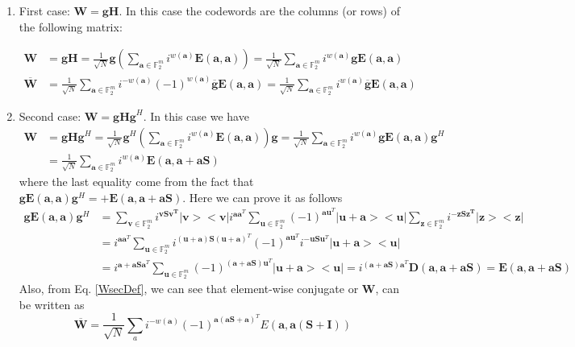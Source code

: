 \documentclass{article}
\begin{document}
	\begin{enumerate}
		\item First case:
		$\mathbf{W=gH}$. In this case the codewords are the columns (or rows) of the following matrix:
		
		\begin{align}
			\mathbf{W} &= \mathbf{g}\mathbf{H} = \frac{1}{\sqrt{N}}\mathbf{g}\left(\sum_{\mathbf{a} \in \mathbb{F}^m_2} i^{w(\mathbf{a})}\mathbf{E}(\mathbf{a},\mathbf{a})\right) = \frac{1}{\sqrt{N}}\sum_{\mathbf{a} \in \mathbb{F}^m_2} i^{w(\mathbf{a})}\mathbf{g}\mathbf{E}(\mathbf{a},\mathbf{a}) \label{WfirstDef} \\
			\overline{\mathbf{W}} &= \frac{1}{\sqrt{N}}\sum_{\mathbf{a} \in \mathbb{F}^m_2} i^{-w(\mathbf{a})}(-1)^{w(\mathbf{a})}\overline{\mathbf{g}}\mathbf{E}(\mathbf{a},\mathbf{a}) = \frac{1}{\sqrt{N}}\sum_{\mathbf{a} \in \mathbb{F}^m_2} i^{w(\mathbf{a})}\overline{\mathbf{g}}\mathbf{E}(\mathbf{a},\mathbf{a}) \label{WbarFirstDef}
		\end{align}
	\item Second case: $\mathbf{W=gHg}^H$. In this case we have
	\begin{align}
		\mathbf{W} &= \mathbf{g}\mathbf{H}\mathbf{g}^H = \frac{1}{\sqrt{N}}\mathbf{g}^H\left(\sum_{\mathbf{a} \in \mathbb{F}^m_2} i^{w(\mathbf{a})}\mathbf{E}(\mathbf{a},\mathbf{a})\right)\mathbf{g} = \frac{1}{\sqrt{N}}\sum_{\mathbf{a} \in \mathbb{F}^m_2} i^{w(\mathbf{a})}\mathbf{g}\mathbf{E}(\mathbf{a},\mathbf{a})\mathbf{g}^H\nonumber  \\ 
		&=\frac{1}{\sqrt{N}}\sum_{\mathbf{a} \in \mathbb{F}^m_2} i^{w(\mathbf{a})}\mathbf{E}(\mathbf{a, a+aS}) \label{WsecDef}
	\end{align}
where the last equality come from the fact that $\mathbf{g}\mathbf{E}(\mathbf{a},\mathbf{a}) \mathbf{g}^H = +\mathbf{E}(\mathbf{a,a+a S})$. Here we can prove it as follows
	\begin{align*}
		\mathbf{g} \mathbf{E}(\mathbf{a,a}) \mathbf{g}^H &=\sum_{\mathbf{v} \in \mathbb{F}^m_2}{i^{\mathbf{v S v^T}} |\mathbf{v}><\mathbf{v}|} i^{\mathbf{a}\mathbf{a}^T}\sum_{\mathbf{u} \in \mathbb{F}^m_2}{(-1)^{\mathbf{a}\mathbf{u}^T} |\mathbf{u+a}><\mathbf{u}|}\sum_{\mathbf{z} \in \mathbb{F}^m_2}{i^{-\mathbf{z S z^T}} |\mathbf{z}><\mathbf{z}|} \nonumber \\
		&= i^{\mathbf{a}\mathbf{a}^T}\sum_{\mathbf{u} \in \mathbb{F}^m_2}{i^{\mathbf{(u+a)S}(\mathbf{u+a})^T} (-1)^{\mathbf{a}\mathbf{u}^T}i^{-\mathbf{uS}\mathbf{u}^T} |\mathbf{u+a}><\mathbf{u}|} \nonumber \\
		&= i^{\mathbf{a+aS}\mathbf{a}^T}\sum_{\mathbf{u} \in \mathbb{F}^m_2}{(-1)^{(\mathbf{a+aS})\mathbf{u}^T} |\mathbf{u+a}><\mathbf{u}|}= i^{(\mathbf{a+aS})\mathbf{a}^T}\mathbf{D}(\mathbf{a, a+aS}) = \mathbf{E}(\mathbf{a, a+aS})
	\end{align*}
Also, from Eq. \ref{WsecDef}, we can see that element-wise conjugate or $\mathbf{W}$, can be written as
\begin{equation}\label{WbarSecDef}
	\overline{\mathbf{W}} = \frac{1}{\sqrt{N}} \sum_a i^{-w(\mathbf{a})}(-1)^{\mathbf{a}(\mathbf{a}\mathbf{S} + \mathbf{a})^T} E(\mathbf{a}, \mathbf{a}(\mathbf{S} + \mathbf{I}))
\end{equation}
	\end{enumerate}
\end{document}
